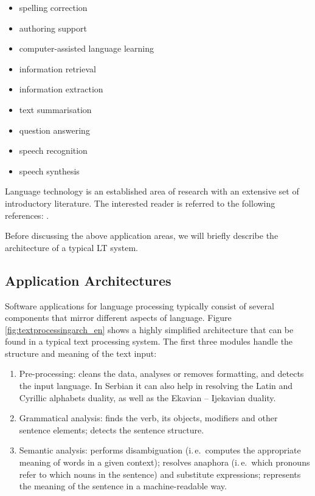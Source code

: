\begin{multicols}{2}
\begin{itemize}
\item spelling correction
\item authoring support
\item computer-assisted language learning
\item information retrieval 
\item information extraction
\item text summarisation
\item question answering
\item speech recognition 
\item speech synthesis 
\end{itemize}

Language technology is an established area of research with an extensive set of introductory literature. The interested reader is referred to the following references:  \cite{jurafsky-martin01, manning-schuetze1, lt-survey1}.

Before discussing the above application areas, we will briefly describe the architecture of a typical LT system.

 \subsection {Application Architectures}
   
Software applications for language processing typically consist of several components that mirror different aspects of language. Figure \ref{fig:textprocessingarch_en} shows a highly simplified architecture that can be found in a typical text processing system. The first three modules handle the structure and meaning of the text input:

\begin{enumerate}
 \item Pre-processing: cleans the data, analyses or removes formatting, and detects the input language. In Serbian it can also help in resolving the Latin and Cyrillic alphabets duality, as well as the Ekavian – Ijekavian duality.
\item Grammatical analysis: finds the verb, its objects, modifiers and other sentence elements; detects the sentence structure.
\item Semantic analysis: performs disambiguation (i.\,e.~computes the appropriate meaning of words in a given context); resolves anaphora (i.\,e.~which pronouns refer to which nouns in the sentence) and substitute expressions; represents the meaning of the sentence in a machine-readable way.
\end{enumerate}


\end{multicols}
